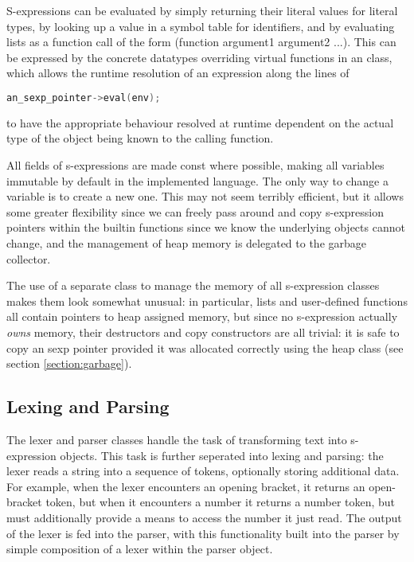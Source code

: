 \documentclass[12pt]{article}
\begin{document}
 S-expressions can be evaluated by simply returning their literal
values for literal types, by looking up a value in a symbol table for identifiers, and by evaluating lists as a function call of the form
(function argument1 argument2 ...). This can be expressed by the concrete
datatypes overriding virtual functions in an class, which allows
the runtime resolution of an expression along the lines of
\begin{lstlisting}[language=C++]
  an_sexp_pointer->eval(env);
\end{lstlisting}
to have the appropriate behaviour resolved at runtime dependent on the actual
type of the object being known to the calling function.

All fields of s-expressions are made const where possible, making all variables
immutable by default in the implemented language. The only way to change a variable is to create a new one. This may not seem terribly efficient, but it
allows some greater flexibility since we can freely pass around and copy s-expression pointers within the builtin functions since we know the underlying objects cannot change, and the management of heap memory is delegated to the garbage collector.

The use of a separate class to manage the memory of all s-expression classes
makes them look somewhat unusual: in particular, lists and user-defined functions all contain pointers to heap assigned memory, but since no s-expression actually \textit{owns} memory, their destructors and copy constructors are all trivial: it is safe to copy an sexp pointer provided it was allocated correctly using the heap class (see section \ref{section:garbage}).

\subsection{Lexing and Parsing}
\label{section:parser}

The lexer and parser classes handle the task of transforming text into s-expression objects. This task is further seperated into lexing and parsing:
the lexer reads a string into a sequence of tokens, optionally storing additional data. For example, when the lexer encounters an opening bracket, it
returns an open-bracket token, but when it encounters  a number it returns a number token, but must additionally provide a means to access the number it just read.
The output of the lexer is fed into the parser, with this functionality built into the parser by simple composition of a lexer within the parser object.
\end{document}
